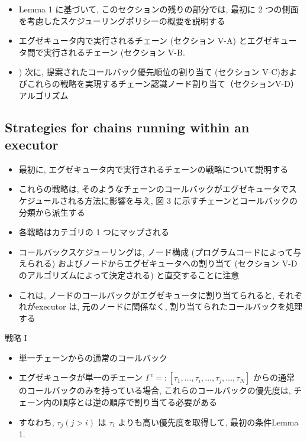 \begin{frame}{}
    \begin{itemize}
        \item Lemma 1 に基づいて, このセクションの残りの部分では, 最初に 2 つの側面を考慮したスケジューリングポリシーの概要を説明する
        \item エグゼキュータ内で実行されるチェーン (セクション V-A) とエグゼキュータ間で実行されるチェーン (セクション V-B.
        \item ) 次に, 提案されたコールバック優先順位の割り当て (セクション V-C)およびこれらの戦略を実現するチェーン認識ノード割り当て（セクションV-D）アルゴリズム
    \end{itemize}
\end{frame}


\subsection{Strategies for chains running within an executor}
\label{ssec: strategies for chains running within an executor}

\begin{frame}{}
    \begin{itemize}
        \item 最初に, エグゼキュータ内で実行されるチェーンの戦略について説明する
        \item これらの戦略は, そのようなチェーンのコールバックがエグゼキュータでスケジュールされる方法に影響を与え, 図 3 に示すチェーンとコールバックの分類から派生する
        \item 各戦略はカテゴリの 1 つにマップされる
        \item コールバックスケジューリングは, ノード構成 (プログラムコードによって与えられる) およびノードからエグゼキュータへの割り当て (セクション V-D のアルゴリズムによって決定される) と直交することに注意
        \item これは, ノードのコールバックがエグゼキュータに割り当てられると, それぞれがexecutor は, 元のノードに関係なく, 割り当てられたコールバックを処理する
    \end{itemize}
\end{frame}

\begin{frame}{戦略 I}
    \begin{itemize}
        \item 単一チェーンからの通常のコールバック
        \item エグゼキュータが単一のチェーン $\Gamma^{c}=:\left[\tau_{1}, \ldots, \tau_{i}, \ldots, \tau_{j}, \ldots, \tau_{N}\right]$ からの通常のコールバックのみを持っている場合, これらのコールバックの優先度は, チェーン内の順序とは逆の順序で割り当てる必要がある
        \item すなわち, $\tau_{j}(j>i)$ は $\tau_{i}$ よりも高い優先度を取得して, 最初の条件Lemma 1.
    \end{itemize}
\end{frame}

